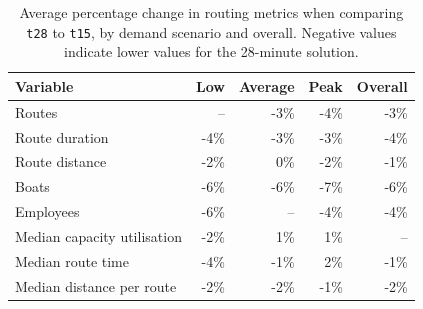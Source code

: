 \documentclass[12pt]{article}
\begin{document}
\begin{table}[htbp]
  \centering
  \caption{Average percentage change in routing metrics when comparing \texttt{t28} to \texttt{t15}, by demand scenario and overall. Negative values indicate lower values for the 28-minute solution.}
  \label{tab:results-sum}

  \begin{tabular}{l|rrrr}
    \toprule
    \textbf{Variable}           & \textbf{Low} & \textbf{Average} & \textbf{Peak} & \textbf{Overall} \\
    \midrule
    Routes                      & --           & -3\%             & -4\%          & -3\%             \\
    Route duration              & -4\%         & -3\%             & -3\%          & -4\%             \\
    Route distance              & -2\%         & 0\%              & -2\%          & -1\%             \\
    Boats                       & -6\%         & -6\%             & -7\%          & -6\%             \\
    Employees                   & -6\%         & --               & -4\%          & -4\%             \\
    Median capacity utilisation & -2\%         & 1\%              & 1\%           & --               \\
    Median route time           & -4\%         & -1\%             & 2\%           & -1\%             \\
    Median distance per route   & -2\%         & -2\%             & -1\%          & -2\%             \\
    \bottomrule
  \end{tabular}
\end{table}
\end{document}
